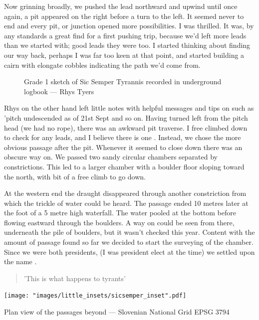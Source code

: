 Now grinning broadly, we pushed the lead northward and upwind until once again, a pit appeared on the right before a turn to the left. It seemed never to end and every pit, or junction opened more possibilities. I was thrilled. It was, by any standards a great find for a first pushing trip, because we'd left more leads than we started with; good leads they were too. I started thinking about finding our way back, perhaps I was far too keen at that point, and started building a cairn with elongate cobbles indicating the path we'd come from. 

\begin{figure}[t!]
\checkoddpage \ifoddpage \forcerectofloat \else \forceversofloat \fi
\centering
{}
\caption{Grade 1 sketch of Sic Semper Tyrannis recorded in underground logbook --- Rhys Tyers}
\label{G1 sketch}
\end{figure}

Rhys on the other hand left little notes with helpful messages and tips on such as 'pitch undescended as of 21st Sept and so on. Having turned left from the pitch head (we had no rope), there was an awkward pit traverse. I free climbed down to check for any leads, and I believe there is one \sidenote. Instead, we chose the more obvious passage after the pit. Whenever it seemed to close down there was an obscure way on. We passed two sandy circular chambers separated by constrictions. This led to a larger chamber with a boulder floor sloping toward the north, with bit of a free climb to go down. 

At the western end the draught disappeared through another constriction from which the trickle of water could be heard. The passage ended 10 metres later at the foot of a 5 metre high waterfall. The water pooled at the bottom before flowing eastward through the boulders. A way on could be seen from there, underneath the pile of boulders, but it wasn't checked this year. Content with the amount of passage found so far we decided to start the surveying of the chamber. Since we were both presidents, (I was president elect at the time) we settled upon the name . 
\begin{quote} 'This is what happens to tyrants' \end{quote}

\begin{marginfigure}
	\texttt{[image: "images/little\_insets/sicsemper\_inset".pdf]}
	\caption*{Plan view of the \protect{} passages beyond \protect{} --- Slovenian National Grid EPSG 3794}
\end{marginfigure}


